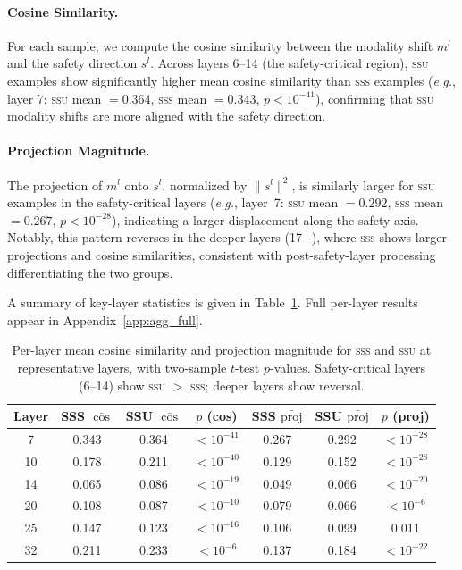 \documentclass{article}
\newcommand{\ssu}{\textsc{ssu}}
\newcommand{\sss}{\textsc{sss}}
\newcommand{\eg}{\emph{e.g.}}
\begin{document}
\paragraph{Cosine Similarity.}
For each sample, we compute the cosine similarity between the modality shift
$m^l$ and the safety direction $s^l$.  Across layers 6--14 (the safety-critical
region), \ssu{} examples show significantly higher mean cosine similarity than
\sss{} examples (\eg, layer 7: \ssu{} mean $= 0.364$, \sss{} mean $= 0.343$,
$p < 10^{-41}$), confirming that \ssu{} modality shifts are more aligned with
the safety direction.

\paragraph{Projection Magnitude.}
The projection of $m^l$ onto $s^l$, normalized by $\|s^l\|^2$, is similarly
larger for \ssu{} examples in the safety-critical layers (\eg, layer~7: \ssu{}
mean $= 0.292$, \sss{} mean $= 0.267$, $p < 10^{-28}$), indicating a larger
displacement along the safety axis.  Notably, this pattern reverses in the
deeper layers (17+), where \sss{} shows larger projections and cosine similarities,
consistent with post-safety-layer processing differentiating the two groups.

A summary of key-layer statistics is given in Table~\ref{tab:agg_stats}.
Full per-layer results appear in Appendix~\ref{app:agg_full}.

\begin{table}[t]
\centering
\caption{Per-layer mean cosine similarity and projection magnitude for \sss{}
         and \ssu{} at representative layers, with two-sample $t$-test $p$-values.
         Safety-critical layers (6--14) show \ssu{} $>$ \sss{}; deeper layers
         show reversal.}
\label{tab:agg_stats}
\small
\begin{tabular}{c ccc ccc}
\toprule
Layer
  & SSS $\bar{\cos}$ & SSU $\bar{\cos}$ & $p$ (cos)
  & SSS $\bar{\text{proj}}$ & SSU $\bar{\text{proj}}$ & $p$ (proj) \\
\midrule
 7 & 0.343 & 0.364 & $<10^{-41}$ & 0.267 & 0.292 & $<10^{-28}$ \\
10 & 0.178 & 0.211 & $<10^{-40}$ & 0.129 & 0.152 & $<10^{-28}$ \\
14 & 0.065 & 0.086 & $<10^{-19}$ & 0.049 & 0.066 & $<10^{-20}$ \\
20 & 0.108 & 0.087 & $<10^{-10}$ & 0.079 & 0.066 & $<10^{-6}$  \\
25 & 0.147 & 0.123 & $<10^{-16}$ & 0.106 & 0.099 & 0.011       \\
32 & 0.211 & 0.233 & $<10^{-6}$  & 0.137 & 0.184 & $<10^{-22}$ \\
\bottomrule
\end{tabular}
\end{table}
\end{document}
